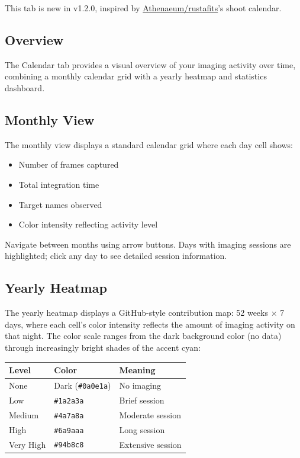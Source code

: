 \documentclass[11pt,a4paper]{article}
\begin{document}
\begin{newfeaturebox}
This tab is new in v1.2.0, inspired by \href{https://github.com/eg013ra1n/rustafits}{Athenaeum/rustafits}'s shoot calendar.
\end{newfeaturebox}

\subsection{Overview}

The Calendar tab provides a visual overview of your imaging activity over time, combining a monthly calendar grid with a yearly heatmap and statistics dashboard.

\subsection{Monthly View}

The monthly view displays a standard calendar grid where each day cell shows:
\begin{itemize}
    \item Number of frames captured
    \item Total integration time
    \item Target names observed
    \item Color intensity reflecting activity level
\end{itemize}

Navigate between months using arrow buttons. Days with imaging sessions are highlighted; click any day to see detailed session information.

\subsection{Yearly Heatmap}

The yearly heatmap displays a GitHub-style contribution map: 52 weeks $\times$ 7 days, where each cell's color intensity reflects the amount of imaging activity on that night. The color scale ranges from the dark background color (no data) through increasingly bright shades of the accent cyan:

\begin{center}
\begin{tabular}{lll}
\toprule
\textbf{Level} & \textbf{Color} & \textbf{Meaning} \\
\midrule
None & Dark (\texttt{\#0a0e1a}) & No imaging \\
Low & \texttt{\#1a2a3a} & Brief session \\
Medium & \texttt{\#4a7a8a} & Moderate session \\
High & \texttt{\#6a9aaa} & Long session \\
Very High & \texttt{\#94b8c8} & Extensive session \\
\bottomrule
\end{tabular}
\end{center}
\end{document}

